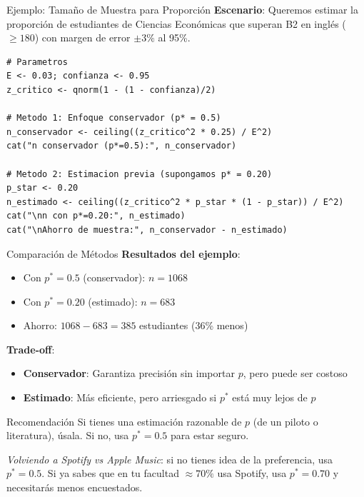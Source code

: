 \documentclass[aspectratio=169, 11pt]{beamer}
\begin{document}
\begin{frame}[fragile]{Ejemplo: Tamaño de Muestra para Proporción}
\small
\textbf{Escenario}: Queremos estimar la proporción de estudiantes de Ciencias Econ\'omicas que superan B2 en inglés ( $\geq 180$) con margen de error $\pm 3\%$ al 95\%.

\begin{lstlisting}[basicstyle=\ttfamily\scriptsize]
# Parametros
E <- 0.03; confianza <- 0.95
z_critico <- qnorm(1 - (1 - confianza)/2)

# Metodo 1: Enfoque conservador (p* = 0.5)
n_conservador <- ceiling((z_critico^2 * 0.25) / E^2)
cat("n conservador (p*=0.5):", n_conservador)

# Metodo 2: Estimacion previa (supongamos p* = 0.20)
p_star <- 0.20
n_estimado <- ceiling((z_critico^2 * p_star * (1 - p_star)) / E^2)
cat("\nn con p*=0.20:", n_estimado)
cat("\nAhorro de muestra:", n_conservador - n_estimado)
\end{lstlisting}
\end{frame}

\begin{frame}{Comparación de Métodos}
\textbf{Resultados del ejemplo}:
\begin{itemize}
  \item Con $p^* = 0.5$ (conservador): $n = 1068$
  \item Con $p^* = 0.20$ (estimado): $n = 683$
  \item Ahorro: $1068 - 683 = 385$ estudiantes (36\% menos)
\end{itemize}

\vspace{0.3cm}
\textbf{Trade-off}:
\begin{itemize}
  \item \textbf{Conservador}: Garantiza precisión sin importar $p$, pero puede ser costoso
  \item \textbf{Estimado}: Más eficiente, pero arriesgado si $p^*$ está muy lejos de $p$
\end{itemize}

\vspace{0.3cm}
\begin{exampleblock}{Recomendación}
Si tienes una estimación razonable de $p$ (de un piloto o literatura), \'usala. Si no, usa $p^* = 0.5$ para estar seguro.

\smallskip
\textit{Volviendo a Spotify vs Apple Music}: si no tienes idea de la preferencia, usa $p^* = 0.5$. Si ya sabes que en tu facultad $\approx 70\%$ usa Spotify, usa $p^* = 0.70$ y necesitar\'as menos encuestados.
\end{exampleblock}
\end{frame}
\end{document}
